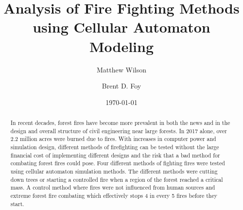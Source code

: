 \documentclass[ aps, pra, reprint, notitlepage ]{revtex4-1}
\begin{document}
\title{Analysis of Fire Fighting Methods using Cellular Automaton Modeling}



\author{Matthew Wilson}

\author{Brent D. Foy}

\date{\today}

\begin{abstract}
	In recent decades, forest fires have become more prevalent in both the news and in the design and overall structure of civil engineering near large forests. In 2017 alone, over 2.2 million acres were burned due to fires. With increases in computer power and simulation design, different methods of firefighting can be tested without the large financial cost of implementing different designs and the risk that a bad method for combating forest fires could pose. Four different methods of fighting fires were tested using cellular automaton simulation methods. The different methods were cutting down trees or starting a controlled fire when a region of the forest reached a critical mass. A control method where fires were not influenced from human sources and extreme forest fire combating which effectively stops 4 in every 5 fires before they start. 
\end{abstract}

\maketitle

\end{document}
